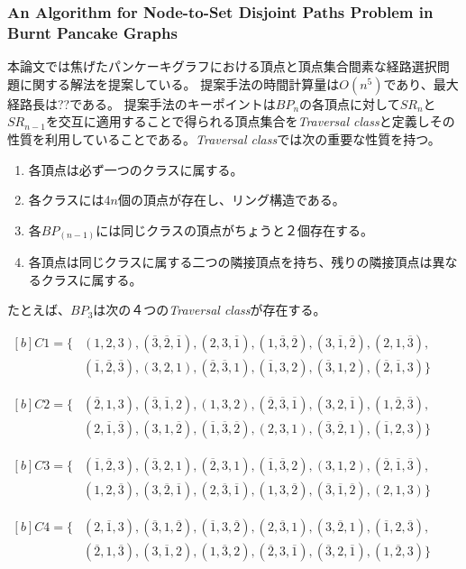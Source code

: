 \documentclass[11pt,a4j]{jsarticle}
\theoremstyle{plain}
\def\O#1{\overline#1}
\begin{document}
\subsubsection{An Algorithm for Node-to-Set Disjoint Paths Problem in Burnt Pancake Graphs}
本論文\cite{bpn-n2s}では焦げたパンケーキグラフにおける頂点と頂点集合間素な経路選択問題に関する解法を提案している。
提案手法の時間計算量は$O(n^5)$であり、最大経路長は??である。
提案手法のキーポイントは$BP_n$の各頂点に対して$SR_n$と$SR_{n-1}$を交互に適用することで得られる頂点集合を{\it Traversal class}と定義しその性質を利用していることである。{\it Traversal class}では次の重要な性質を持つ。
\begin{enumerate}
 \item 各頂点は必ず一つのクラスに属する。
 \item 各クラスには4$n$個の頂点が存在し、リング構造である。
 \item 各$BP_(n-1)$には同じクラスの頂点がちょうと２個存在する。
 \item 各頂点は同じクラスに属する二つの隣接頂点を持ち、残りの隣接頂点は異なるクラスに属する。
\end{enumerate}
たとえば、$BP_3$は次の４つの{\it Traversal class}が存在する。
\begin{description}
\item 
$\begin{aligned}[b] {C1} = \{& (1, 2, 3), (\O3, \O2, \O1), (2, 3, \O1),  (1, \O3, \O2),(3, \O1, \O2), (2, 1, \O3),\\
    	 				 & (\O1, \O2, \O3), (3, 2, 1),(\O2, \O3, 1), (\O1, 3, 2), (\O3, 1, 2),   (\O2, \O1, 3)  \}
\end{aligned}$

\item 
$\begin{aligned}[b] {C2} = \{&(\O2, 1, 3), (\O3, \O1, 2), (1, 3, 2), (\O2, \O3, \O1),(3, 2, \O1), (1, \O2, \O3),\\
					  &(2, \O1, \O3), (3, 1, \O2),(\O1, \O3, \O2), (2, 3, 1), (\O3, \O2, 1), (\O1, 2, 3)\}
\end{aligned}$

\item 
$\begin{aligned}[b] {C3} = \{&(\O1, \O2, 3), (\O3, 2, 1), (\O2, 3, 1), (\O1, \O3, 2),(3, 1, 2), (\O2, \O1, \O3),\\
					 & (1, 2, \O3), (3, \O2, \O1),(2, \O3, \O1), (1, 3, \O2), (\O3, \O1, \O2), (2, 1, 3)\}
\end{aligned}$

\item 
$\begin{aligned}[b] {C4} = \{&(2, \O1, 3), (\O3, 1, \O2), (\O1, 3, \O2), (2, \O3, 1),(3, \O2, 1), (\O1, 2, \O3),\\
					  &(\O2, 1, \O3), (3, \O1, 2),(1, \O3, 2), (\O2, 3, \O1), (\O3, 2, \O1), (1, \O2, 3)\}
\end{aligned}$
\end{description}
\end{document}
